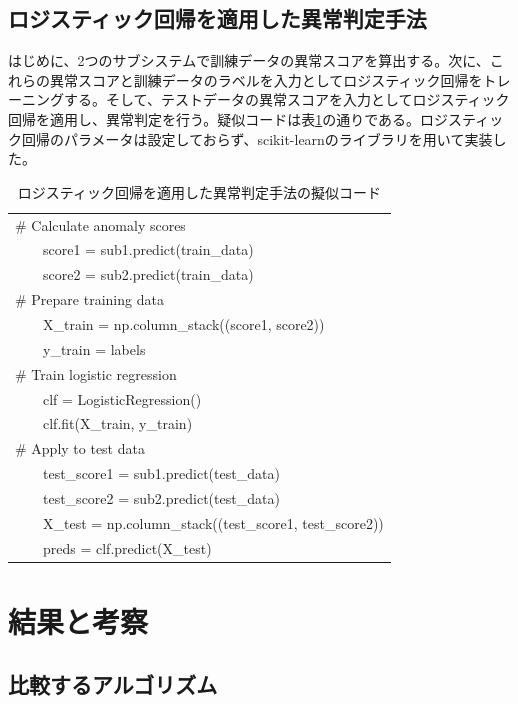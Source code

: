 \documentclass{css}
\begin{document}
\subsection{ロジスティック回帰を適用した異常判定手法}
はじめに、2つのサブシステムで訓練データの異常スコアを算出する。次に、これらの異常スコアと訓練データのラベルを入力としてロジスティック回帰をトレーニングする。そして、テストデータの異常スコアを入力としてロジスティック回帰を適用し、異常判定を行う。疑似コードは表\ref{tab:logistic_regression}の通りである。ロジスティック回帰のパラメータは設定しておらず、scikit-learnのライブラリを用いて実装した。

\begin{table}[h!]
    \centering
    \caption{ロジスティック回帰を適用した異常判定手法の擬似コード}
    \begin{tabular}{|l|}
    \hline
    \# Calculate anomaly scores \\
       \ \ \ \ score1 = sub1.predict(train\_data) \\
       \ \ \ \ score2 = sub2.predict(train\_data) \\ 
    \# Prepare training data \\
       \ \ \ \ X\_train = np.column\_stack((score1, score2)) \\
       \ \ \ \ y\_train = labels \\ 
    \# Train logistic regression \\
       \ \ \ \ clf = LogisticRegression() \\
       \ \ \ \ clf.fit(X\_train, y\_train) \\ 
    \# Apply to test data \\
       \ \ \ \ test\_score1 = sub1.predict(test\_data) \\
       \ \ \ \ test\_score2 = sub2.predict(test\_data) \\
       \ \ \ \ X\_test = np.column\_stack((test\_score1, test\_score2)) \\
       \ \ \ \ preds = clf.predict(X\_test) \\ 
    \hline
    \end{tabular}
    \label{tab:logistic_regression}
\end{table}


\section{結果と考察}

\subsection{比較するアルゴリズム}
\end{document}
